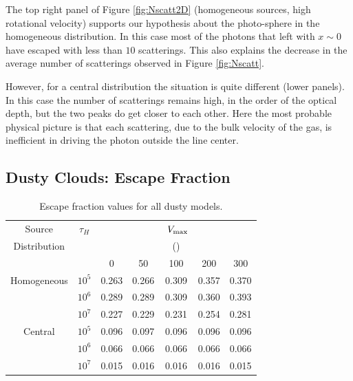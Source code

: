 \documentclass{emulateapj}
\newcommand{\kms}{{\ifmmode{{\mathrm{\,km\ s}^{-1}}}\else{\,km~s$^{-1}$}\fi}}
\begin{document}
The top right panel of Figure \ref{fig:Nscatt2D} (homogeneous sources,
high rotational velocity) supports our hypothesis about
the photo-sphere in the homogeneous distribution. In this case most of
the photons that left with $x\sim 0$ have escaped with less than $10$
scatterings. This also explains the decrease in the average number of
scatterings observed in Figure \ref{fig:Nscatt}.

However, for a central distribution the situation is quite different
(lower panels). In this case the number of scatterings remains high,
in the order of the optical depth, but the two peaks do get closer to each
other. Here the most probable physical picture is that each
scattering, due to the bulk velocity of the gas, is inefficient in
driving the photon outside the line center.



\subsection{Dusty Clouds: Escape Fraction}
\label{sec:escapefraction}

\begin{table}
\begin{center}
\begin{tabular}{c ccc ccc}
\hline \hline
Source & $\tau_{H}$ & & & $\ V_{\rm max}$& & \\
Distribution& &  &  & (\kms) & & \\ 
& & 0 & 50 & 100 &200 & 300\\ \hline 
Homogeneous & $10^{5}$& 0.263 & 0.266 &  0.309 &  0.357 &  0.370  \\
           & $10^{6}$ & 0.289 &  0.289 &   0.309 &  0.360 &  0.393 \\
         &$10^{7}$ &  0.227 &  0.229 &  0.231 &  0.254 &  0.281 \\
Central & $10^{5}$ &  0.096 & 0.097 & 0.096 &  0.096 & 0.096 \\
  &$10^{6}$ & 0.066 & 0.066 &  0.066 &  0.066 &  0.066 \\
 &$10^{7}$ & 0.015 &  0.016 & 0.016 & 0.016 & 0.015 \\
\hline
\end{tabular}
\caption{
 Escape fraction values for all dusty models. } 
\label{table:escape}
\end{center}
\end{table}
\end{document}
